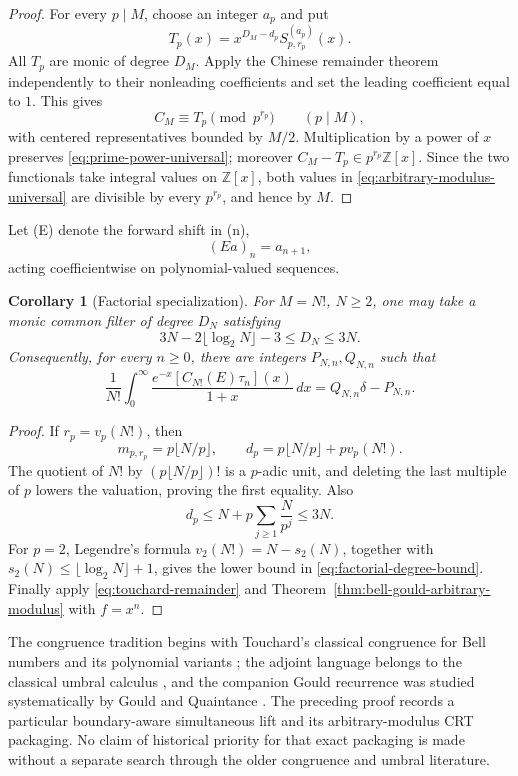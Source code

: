 \documentclass[11pt]{article}
\newtheorem{corollary}[theorem]{Corollary}
\theoremstyle{definition}
\theoremstyle{remark}
\newcommand{\Z}{\mathbb Z}
\begin{document}
\begin{proof}
For every \(p\mid M\), choose an integer \(a_p\) and put
\[
 T_p(x)=x^{D_M-d_p}S_{p,r_p}^{(a_p)}(x).
\]
All \(T_p\) are monic of degree \(D_M\).  Apply the Chinese remainder
theorem independently to their nonleading coefficients and set the leading
coefficient equal to \(1\).  This gives
\[
 C_M\equiv T_p\pmod{p^{r_p}}\qquad(p\mid M),
\]
with centered representatives bounded by \(M/2\).  Multiplication by a
power of \(x\) preserves \eqref{eq:prime-power-universal}; moreover
\(C_M-T_p\in p^{r_p}\Z[x]\).  Since the two functionals take integral
values on \(\Z[x]\), both values in
\eqref{eq:arbitrary-modulus-universal} are divisible by every
\(p^{r_p}\), and hence by \(M\).
\end{proof}

Let (E) denote the forward shift in (n),
\[
 (Ea)_n=a_{n+1},
\]
acting coefficientwise on polynomial-valued sequences.

\begin{corollary}[Factorial specialization]
\label{cor:bell-gould-factorial}
For \(M=N!\), \(N\geq2\), one may take a monic common filter of degree
\(D_N\) satisfying
\begin{equation}\label{eq:factorial-degree-bound}
 3N-2\lfloor\log_2N\rfloor-3
 \leq D_N\leq3N.
\end{equation}
Consequently, for every \(n\geq0\), there are integers \(P_{N,n},Q_{N,n}\)
such that
\begin{equation}\label{eq:factorial-touchard-integral}
 \frac1{N!}\int_0^\infty
 \frac{e^{-x}[C_{N!}(E)\tau_n](x)}{1+x}\,dx
 =Q_{N,n}\delta-P_{N,n}.
\end{equation}
\end{corollary}

\begin{proof}
If \(r_p=v_p(N!)\), then
\[
 m_{p,r_p}=p\lfloor N/p\rfloor,
 \qquad
 d_p=p\lfloor N/p\rfloor+pv_p(N!).
\]
The quotient of \(N!\) by
\((p\lfloor N/p\rfloor)!\) is a \(p\)-adic unit, and deleting the last
multiple of \(p\) lowers the valuation, proving the first equality.  Also
\[
 d_p\leq N+p\sum_{j\geq1}\frac{N}{p^j}\leq3N.
\]
For \(p=2\), Legendre's formula
\(v_2(N!)=N-s_2(N)\), together with
\(s_2(N)\leq\lfloor\log_2N\rfloor+1\), gives the lower bound in
\eqref{eq:factorial-degree-bound}.  Finally apply
\eqref{eq:touchard-remainder} and
Theorem~\ref{thm:bell-gould-arbitrary-modulus} with \(f=x^n\).
\end{proof}

The congruence tradition begins with Touchard's classical congruence for
Bell numbers and its polynomial variants
\cite{Touchard1933,SunZagier2011}; the adjoint language belongs to the
classical umbral calculus \cite{Roman1984}, and the companion Gould
recurrence was studied systematically by Gould and Quaintance
\cite{GouldQuaintance2007}.  The preceding proof records a particular
boundary-aware simultaneous lift and its arbitrary-modulus CRT packaging.
No claim of historical priority for that exact packaging is made without a
separate search through the older congruence and umbral literature.
\end{document}
